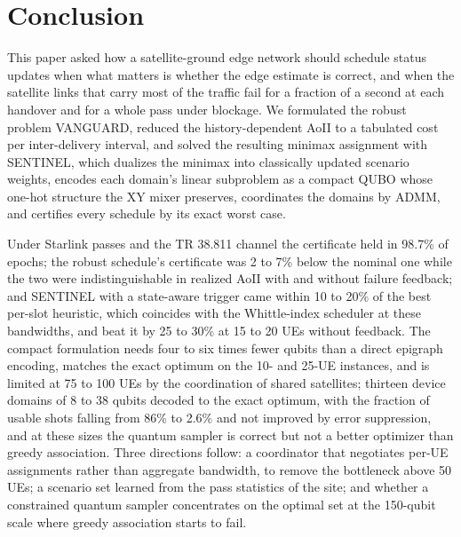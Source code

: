\section{Conclusion}
\label{sec:conclusion}

This paper asked how a satellite-ground edge network should schedule status updates when what matters is whether the
edge estimate is correct, and when the satellite links that carry most of the traffic fail for a fraction of a second
at each handover and for a whole pass under blockage. We formulated the robust problem VANGUARD, reduced the
history-dependent AoII to a tabulated cost per inter-delivery interval, and solved the resulting minimax assignment
with SENTINEL, which dualizes the minimax into classically updated scenario weights, encodes each domain's linear
subproblem as a compact QUBO whose one-hot structure the XY mixer preserves, coordinates the domains by ADMM, and
certifies every schedule by its exact worst case.

Under Starlink passes and the TR 38.811 channel the certificate held in 98.7\% of epochs; the robust schedule's
certificate was 2 to 7\% below the nominal one while the two were indistinguishable in realized AoII with and without
failure feedback; and SENTINEL with a state-aware trigger came within 10 to 20\% of the best per-slot heuristic, which
coincides with the Whittle-index scheduler at these bandwidths, and beat it by 25 to 30\% at 15 to 20 UEs without
feedback. The compact formulation needs four to six times fewer qubits than a direct epigraph encoding, matches the
exact optimum on the 10- and 25-UE instances, and is limited at 75 to 100 UEs by the coordination of shared
satellites; thirteen device domains of 8 to 38 qubits decoded to the exact optimum, with the fraction of usable shots
falling from 86\% to 2.6\% and not improved by error suppression, and at these sizes the quantum sampler is correct
but not a better optimizer than greedy association. Three directions follow: a coordinator that negotiates per-UE
assignments rather than aggregate bandwidth, to remove the bottleneck above 50 UEs; a scenario set learned from the
pass statistics of the site; and whether a constrained quantum sampler concentrates on the optimal set at the
150-qubit scale where greedy association starts to fail.
